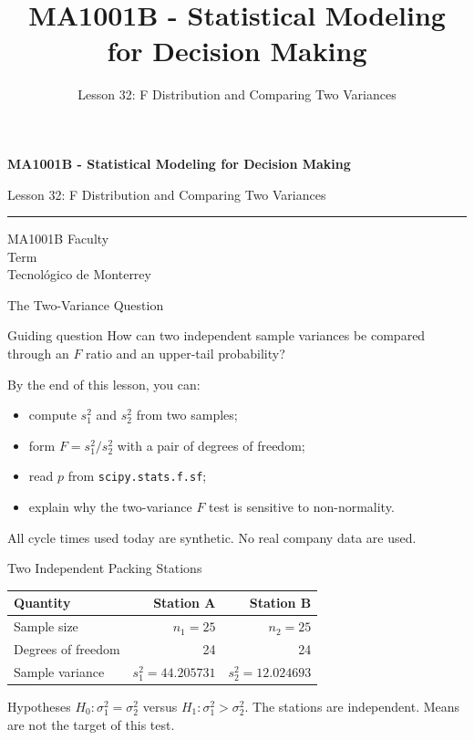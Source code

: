 \documentclass[aspectratio=169,10pt,english]{beamer}
\title{MA1001B - Statistical Modeling for Decision Making}
\subtitle{Lesson 32: F Distribution and Comparing Two Variances}
\author{}
\institute{Tecnol\'ogico de Monterrey}
\date{}
\begin{document}
\begin{frame}[plain]
  \vspace{1.2cm}
  {\Large\bfseries MA1001B - Statistical Modeling for Decision Making\par}
  \vspace{0.7cm}
  {\large Lesson 32: F Distribution and Comparing Two Variances\par}
  \vspace{0.7cm}
  {\color{TecRojo}\rule{\textwidth}{1.2pt}}
  \vspace{0.8cm}

  MA1001B Faculty\\[0.3cm]
  Term\\[0.3cm]
  Tecnol\'ogico de Monterrey
\end{frame}

\begin{frame}{The Two-Variance Question}
  \begin{alertblock}{Guiding question}
    How can two independent sample variances be compared through an $F$
    ratio and an upper-tail probability?
  \end{alertblock}

  \vspace{0.6em}
  By the end of this lesson, you can:
  \begin{itemize}
    \item compute $s_{1}^{2}$ and $s_{2}^{2}$ from two samples;
    \item form $F=s_{1}^{2}/s_{2}^{2}$ with a pair of degrees of freedom;
    \item read $p$ from \texttt{scipy.stats.f.sf};
    \item explain why the two-variance $F$ test is sensitive to non-normality.
  \end{itemize}

  \vfill
  \scriptsize All cycle times used today are synthetic. No real company data are used.
\end{frame}

\begin{frame}{Two Independent Packing Stations}
  \small
  \begin{center}
    \begin{tabular}{lrr}
      \toprule
      \textbf{Quantity} & \textbf{Station A} & \textbf{Station B} \\
      \midrule
      Sample size & $n_{1}=25$ & $n_{2}=25$ \\
      Degrees of freedom & 24 & 24 \\
      Sample variance & $s_{1}^{2}=44.205731$ & $s_{2}^{2}=12.024693$ \\
      \bottomrule
    \end{tabular}
  \end{center}

  \vspace{0.5em}
  \begin{exampleblock}{Hypotheses}
    $H_{0}:\sigma_{1}^{2}=\sigma_{2}^{2}$ versus $H_{1}:\sigma_{1}^{2}>\sigma_{2}^{2}$.
    The stations are independent. Means are not the target of this test.
  \end{exampleblock}
\end{frame}
\end{document}

